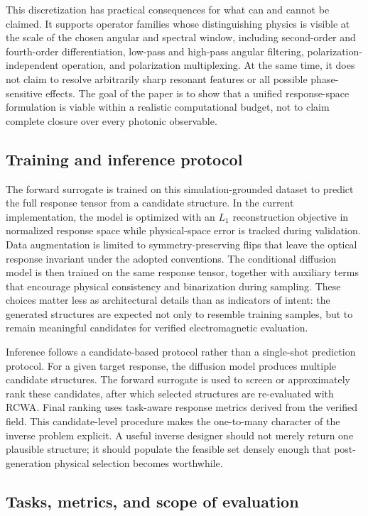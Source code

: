 This discretization has practical consequences for what can and cannot be claimed. It supports operator families whose distinguishing physics is visible at the scale of the chosen angular and spectral window, including second-order and fourth-order differentiation, low-pass and high-pass angular filtering, polarization-independent operation, and polarization multiplexing. At the same time, it does not claim to resolve arbitrarily sharp resonant features or all possible phase-sensitive effects. The goal of the paper is to show that a unified response-space formulation is viable within a realistic computational budget, not to claim complete closure over every photonic observable.

\subsection{Training and inference protocol}

The forward surrogate is trained on this simulation-grounded dataset to predict the full response tensor from a candidate structure. In the current implementation, the model is optimized with an $L_1$ reconstruction objective in normalized response space while physical-space error is tracked during validation. Data augmentation is limited to symmetry-preserving flips that leave the optical response invariant under the adopted conventions. The conditional diffusion model is then trained on the same response tensor, together with auxiliary terms that encourage physical consistency and binarization during sampling. These choices matter less as architectural details than as indicators of intent: the generated structures are expected not only to resemble training samples, but to remain meaningful candidates for verified electromagnetic evaluation.

Inference follows a candidate-based protocol rather than a single-shot prediction protocol. For a given target response, the diffusion model produces multiple candidate structures. The forward surrogate is used to screen or approximately rank these candidates, after which selected structures are re-evaluated with RCWA. Final ranking uses task-aware response metrics derived from the verified field. This candidate-level procedure makes the one-to-many character of the inverse problem explicit. A useful inverse designer should not merely return one plausible structure; it should populate the feasible set densely enough that post-generation physical selection becomes worthwhile.

\subsection{Tasks, metrics, and scope of evaluation}

